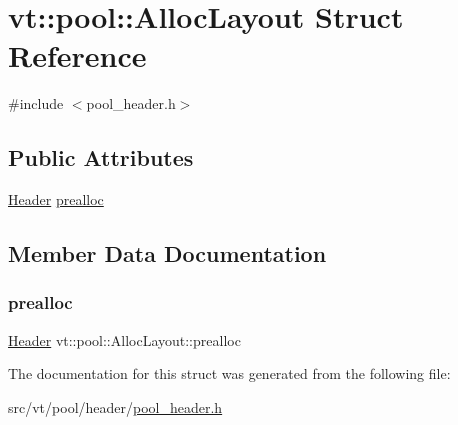 \hypertarget{structvt_1_1pool_1_1_alloc_layout}{}\section{vt\+:\+:pool\+:\+:Alloc\+Layout Struct Reference}
\label{structvt_1_1pool_1_1_alloc_layout}


{\ttfamily \#include $<$pool\+\_\+header.\+h$>$}

\subsection*{Public Attributes}
\begin{DoxyCompactItemize}
\item 
\hyperlink{structvt_1_1pool_1_1_header}{Header} \hyperlink{structvt_1_1pool_1_1_alloc_layout_aa52924574bb32f84ed997e583edccf65}{prealloc}
\end{DoxyCompactItemize}


\subsection{Member Data Documentation}
\mbox{\label{structvt_1_1pool_1_1_alloc_layout_aa52924574bb32f84ed997e583edccf65}} 
\subsubsection{\texorpdfstring{prealloc}{prealloc}}
{\footnotesize\ttfamily \hyperlink{structvt_1_1pool_1_1_header}{Header} vt\+::pool\+::\+Alloc\+Layout\+::prealloc}



The documentation for this struct was generated from the following file\+:\begin{DoxyCompactItemize}
\item 
src/vt/pool/header/\hyperlink{pool__header_8h}{pool\+\_\+header.\+h}\end{DoxyCompactItemize}
